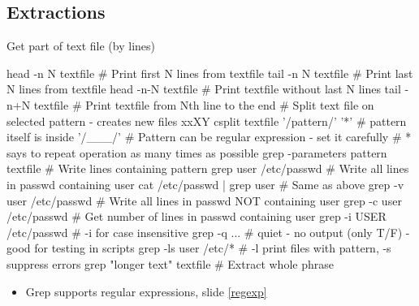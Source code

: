 \documentclass[compress, ucs, xelatex, 11pt, xcolor=svgnames, aspectratio=169,
	hyperref={
		bookmarks=true,
		unicode=true,
		colorlinks=true,
		pdftitle={Linux, command line and MetaCentrum},
		plainpages=false,
		pdfauthor={Vojtech Zeisek},
		pdfsubject={Course about use of Linux command line, writing shell scripts and using MetaCentrum of CESNET},
		pdfcreator={XeLaTeX},
		pdfkeywords={Linux, GNU, BASH, shell, command line, MetaCentrum},
		linkcolor=DarkRed, %
		anchorcolor=DarkBlue, %
		citecolor=Indigo, %
		filecolor=NavyBlue, %
		menucolor=DarkMagenta, %
		urlcolor=DarkBlue, %
		pdftex},
	url={hyphens, lowtilde} %
	]{beamer}
\begin{document}
\subsection{Extractions}

\begin{frame}[fragile]{Get part of text file (by lines)}
	\begin{bashcode}
    head -n N textfile # Print first N lines from textfile
    tail -n N textfile # Print last N lines from textfile
    head -n-N textfile # Print textfile without last N lines
    tail -n+N textfile # Print textfile from Nth line to the end
    # Split text file on selected pattern - creates new files xxXY
    csplit textfile '/pattern/' '{*}' # pattern itself is inside '/___/'
    # Pattern can be regular expression - set it carefully
    # {*} says to repeat operation as many times as possible
    grep -parameters pattern textfile # Write lines containing pattern
    grep user /etc/passwd # Write all lines in passwd containing user
    cat /etc/passwd | grep user # Same as above
    grep -v user /etc/passwd # Write all lines in passwd NOT containing user
    grep -c user /etc/passwd # Get number of lines in passwd containing user
    grep -i USER /etc/passwd # -i for case insensitive
    grep -q ... # quiet - no output (only T/F) - good for testing in scripts
    grep -ls user /etc/* # -l print files with pattern, -s suppress errors
    grep "longer text" textfile # Extract whole phrase
	\end{bashcode}
	\vfill
	\begin{itemize}
		\item Grep supports regular expressions, slide \ref{regexp}
	\end{itemize}
\end{frame}
\end{document}
